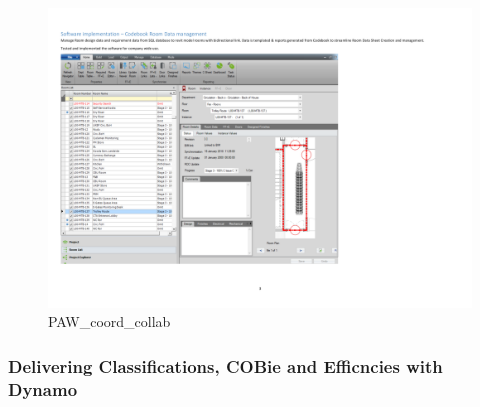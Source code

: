 \documentclass[
]{article}
\begin{document}
\begin{figure}[H]

{\centering \includegraphics{assets/PAW/P+W-BIMcollab-3.png}

}

\caption{PAW\_coord\_collab}

\end{figure}%

\subsubsection{Delivering Classifications, COBie and Efficncies with
Dynamo}\label{delivering-classifications-cobie-and-efficncies-with-dynamo}
\end{document}
